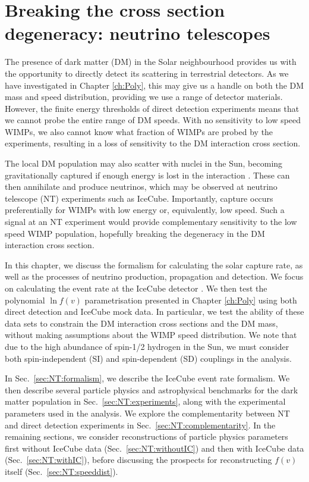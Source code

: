 \chapter[Neutrino telescopes]{Breaking the cross section degeneracy: neutrino telescopes}
\label{ch:NT}

The presence of dark matter (DM) in the Solar neighbourhood provides us with the opportunity to directly detect its scattering in terrestrial detectors. As we have investigated in Chapter \ref{ch:Poly}, this may give us a handle on both the DM mass and speed distribution, providing we use a range of detector materials. However, the finite energy thresholds of direct detection experiments means that we cannot probe the entire range of DM speeds. With no sensitivity to low speed WIMPs, we also cannot know what fraction of WIMPs are probed by the experiments, resulting in a loss of sensitivity to the DM interaction cross section.

The local DM population may also scatter with nuclei in the Sun, becoming gravitationally captured if enough energy is lost in the interaction \cite{Press:1985,Silk:1985, Gaisser:1986, Srednicki:1987, Griest:1987}. These can then annihilate and produce neutrinos, which may be observed at neutrino telescope (NT) experiments such as IceCube. Importantly, capture occurs preferentially for WIMPs with low energy or, equivalently, low speed. Such a signal at an NT experiment would provide complementary sensitivity to the low speed WIMP population, hopefully breaking the degeneracy in the DM interaction cross section.

In this chapter, we discuss the formalism for calculating the solar capture rate, as well as the processes of neutrino production, propagation and detection. We focus on calculating the event rate at the IceCube detector \cite{Aartsen:2013b}. We then test the polynomial $\ln f(v)$ parametrisation presented in Chapter \ref{ch:Poly} using both direct detection and IceCube mock data. In particular, we test the ability of these data sets to constrain the DM interaction cross sections and the DM mass, without making assumptions about the WIMP speed distribution. We note that due to the high abundance of spin-1/2 hydrogen in the Sun, we must consider both spin-independent (SI) and spin-dependent (SD) couplings in the analysis.


In Sec.~\ref{sec:NT:formalism}, we describe the IceCube event rate formalism. We then describe several particle physics and astrophysical benchmarks for the dark matter population in Sec.~\ref{sec:NT:experiments}, along with the experimental parameters used in the analysis. We explore the complementarity between NT and direct detection experiments in Sec.~\ref{sec:NT:complementarity}. In the remaining sections, we consider reconstructions of particle physics parameters first without IceCube data (Sec.~\ref{sec:NT:withoutIC}) and then with IceCube data (Sec.~\ref{sec:NT:withIC}), before discussing the prospects for reconstructing $f(v)$ itself (Sec.~\ref{sec:NT:speeddist}).

